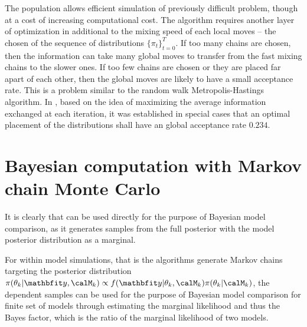 The population \mcmc allows efficient simulation of previously difficult
problem, though at a cost of increasing computational cost. The algorithm
requires another layer of optimization in additional to the mixing speed of
each local moves -- the chosen of the sequence of distributions
$\{\pi_t\}_{t=0}^T$. If too many chains are chosen, then the information can
take many global moves to transfer from the fast mixing chains to the slower
ones. If too few chains are chosen or they are placed far apart of each other,
then the global moves are likely to have a small acceptance rate. This is a
problem similar to the random walk Metropolis-Hastings algorithm. In
\cite{Atchade:2010ha}, based on the idea of maximizing the average information
exchanged at each iteration, it was established in special cases that an
optimal placement of the distributions shall have an global acceptance rate
$0.234$.

\section{Bayesian computation with Markov chain Monte Carlo}
\label{sec:Bayesian computation with Markov chain Monte Carlo}

It is clearly that \rjmcmc can be used directly for the purpose of Bayesian
model comparison, as it generates samples from the full posterior with the
model posterior distribution as a marginal.

For within model simulations, that is the algorithms generate Markov chains
targeting the posterior distribution $\pi(\theta_k|\data,\calM_k) \propto
f(\data|\theta_k,\calM_k)\pi(\theta_k|\calM_k)$, the dependent samples can be
used for the purpose of Bayesian model comparison for finite set of models
through estimating the marginal likelihood and thus the Bayes factor, which is
the ratio of the marginal likelihood of two models.

